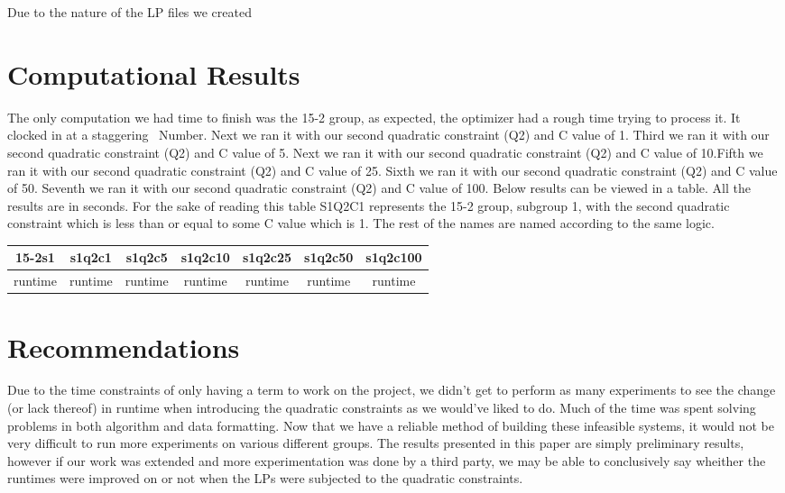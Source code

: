 \documentclass[11pt]{article} %
\theoremstyle{definition}
\theoremstyle{remark}
\begin{document}
Due to the nature of the LP files we created

\section{Computational Results}

The only computation we had time to finish was the 15-2 group, as expected, the optimizer had a rough time trying to process it. It clocked in at a staggering ~Number. Next we ran it with our second quadratic constraint (Q2) and C value of 1. Third we ran it with our second quadratic constraint (Q2) and C value of 5. Next we ran it with our second quadratic constraint (Q2) and C value of 10.Fifth we ran it with our second quadratic constraint (Q2) and C value of 25.  Sixth we ran it with our second quadratic constraint (Q2) and C value of 50. Seventh we ran it with our second quadratic constraint (Q2) and C value of 100. Below results can be viewed in a table. All the results are in seconds. For the sake of reading this table S1Q2C1 represents the 15-2 group, subgroup 1, with the second quadratic constraint which is less than or equal to some C value which is 1. The rest of the names are named according to the same logic.



\begin{center}
 \begin{tabular}{||c c c c c c c||} 
 \hline
 15-2s1 & s1q2c1 & s1q2c5 & s1q2c10 & s1q2c25 & s1q2c50 & s1q2c100\\ [1.5ex] 
 \hline\hline
 runtime & runtime & runtime & runtime & runtime & runtime & runtime
 \\\hline
\end{tabular}
\end{center}



\section{Recommendations}

Due to the time constraints of only having a term to work on the project, we didn't get to perform as many experiments to see the change (or lack thereof) in runtime when introducing the quadratic constraints as we would've liked to do. Much of the time was spent solving problems in both algorithm and data formatting. Now that we have a reliable method of building these infeasible systems, it would not be very difficult to run more experiments on various different groups. The results presented in this paper are simply preliminary results, however if our work was extended and more experimentation was done by a third party, we may be able to conclusively say wheither the runtimes were improved on or not when the LPs were subjected to the quadratic constraints.
\end{document}
